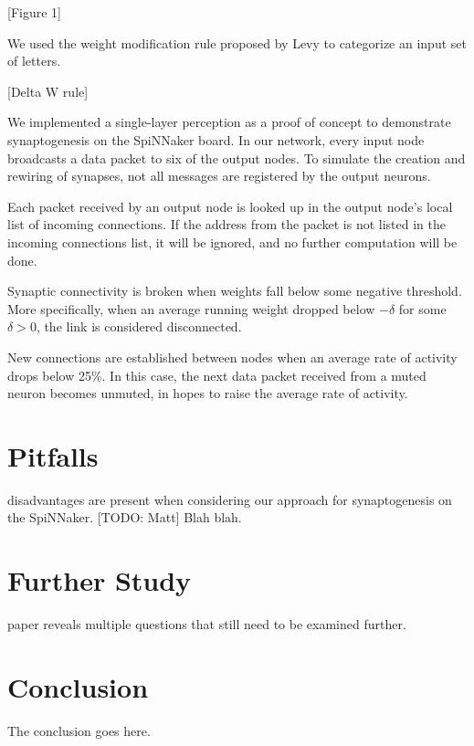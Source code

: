 \documentclass[journal]{./sty/IEEEtran}
\begin{document}
\vspace{0.5cm}
[Figure 1]
\vspace{0.5cm}

We used the weight modification rule proposed by Levy to categorize an input set of letters. 

\vspace{0.5cm}
[Delta W rule]
\vspace{0.5cm}

We implemented a single-layer perception as a proof of concept to demonstrate synaptogenesis on the SpiNNaker board. In our network, every input node broadcasts a data packet to six of the output nodes. To simulate the creation and rewiring of synapses, not all messages are registered by the output neurons. 

Each packet received by an output node is looked up in the output node's local list of incoming connections. If the address from the packet is not listed in the incoming connections list, it will be ignored, and no further computation will be done.

Synaptic connectivity is broken when weights fall below some negative threshold. More specifically, when an average running weight dropped below \(-\delta\) for some \(\delta > 0\), the link is considered disconnected.

New connections are established between nodes when an average rate of activity drops below 25\%. In this case, the next data packet received from a muted neuron becomes unmuted, in hopes to raise the average rate of activity.

\section{Pitfalls}
 disadvantages are present when considering our approach for synaptogenesis on the SpiNNaker. [TODO: Matt] Blah blah.


\section{Further Study}
 paper reveals multiple questions that still need to be examined further. 


\section{Conclusion}
The conclusion goes here.


\end{document}
